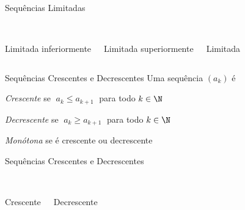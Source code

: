 \documentclass[fleqn,utf8,aspectratio=169,12pt]{beamer}
\begin{document}
\begin{frame}{Sequências Limitadas}
\begin{columns}
  \begin{center}
    \scalebox{0.9}{} \\[5mm]
    Limitada inferiormente
  \end{center}
  \pause
  \begin{center}
    \scalebox{0.9}{} \\[5mm]
    Limitada superiormente
  \end{center}
  \pause
  \begin{center}
    \scalebox{0.9}{} \\[5mm]
    Limitada
  \end{center}
\end{columns}
\end{frame}

\begin{frame}{Sequências Crescentes e Decrescentes}
	Uma sequência $(a_k)$ é

	\bigskip
	\emph{Crescente}   \tabto{30mm} se \emph{$\;a_k \leq a_{k+1}\;$} para todo $k\in\N$

	\pause
	\bigskip
	\emph{Decrescente} \tabto{30mm} se \emph{$\;a_k \geq a_{k+1}\;$} para todo $k\in\N$

	\pause
	\bigskip
	\emph{Monótona}    \tabto{30mm} se é crescente ou decrescente
\end{frame}


\begin{frame}{Sequências Crescentes e Decrescentes}
  \begin{columns}
    \begin{center}
      \scalebox{0.9}{} \\[5mm]
      Crescente
    \end{center}
    \pause
    \begin{center}
      \scalebox{0.9}{} \\[5mm]
      Decrescente
    \end{center}
  \end{columns}
\end{frame}
\end{document}
